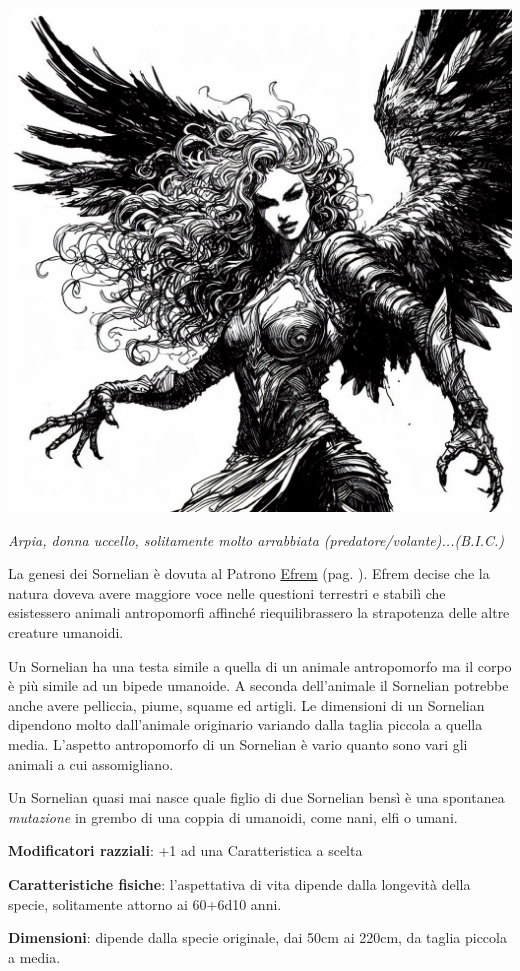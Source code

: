 \begin{multicols}{2}
\begin{center}
\includegraphics[width=0.7\linewidth]{immagini/arpia-ai.png}

\emph{Arpia, donna uccello, solitamente molto arrabbiata (predatore/volante)...(B.I.C.)}

\end{center}

La genesi dei Sornelian è dovuta al Patrono \hyperlink{efrem}{Efrem} (pag. \pageref{efrem}). Efrem decise che la natura doveva avere maggiore voce nelle questioni terrestri e stabilì che esistessero animali antropomorfi affinché riequilibrassero la strapotenza delle altre creature umanoidi.

Un Sornelian ha una testa simile a quella di un animale antropomorfo ma il corpo è più simile ad un bipede umanoide. A seconda dell'animale il Sornelian potrebbe anche avere pelliccia, piume, squame ed artigli. Le dimensioni di un Sornelian dipendono molto dall'animale originario variando dalla taglia piccola a quella media. L'aspetto antropomorfo di un Sornelian è vario quanto sono vari gli animali a cui assomigliano.

Un Sornelian quasi mai nasce quale figlio di due Sornelian bensì è una spontanea \emph{mutazione} in grembo di una coppia di umanoidi, come nani, elfi o umani.

\textbf{Modificatori razziali}: +1 ad una Caratteristica a scelta

\textbf{Caratteristiche fisiche}: l'aspettativa di vita dipende dalla longevità della specie, solitamente attorno ai 60+6d10 anni.

\textbf{Dimensioni}: dipende dalla specie originale, dai 50cm ai 220cm, da taglia piccola a media.


\end{multicols}
